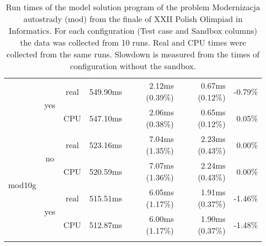 \documentclass[en]{pracamgr}
\begin{document}
\begin{appendices}
\begin{small}
\begin{longtable}{|l|c|c|r|r|r|r|}
                          \cline{2-7}
                          & \multirow{2}{*}{yes} & real & 549.90ms & 2.12ms (0.39\%) & 0.67ms (0.12\%) & -0.79\% \\*
                          &                      & CPU  & 547.10ms & 2.06ms (0.38\%) & 0.65ms (0.12\%) & 0.05\% \\
\hline
\multirow{4}{*}{mod10g}   & \multirow{2}{*}{no}  & real & 523.16ms & 7.04ms (1.35\%) & 2.23ms (0.43\%) & 0.00\% \\*
                          &                      & CPU  & 520.59ms & 7.07ms (1.36\%) & 2.24ms (0.43\%) & 0.00\% \\*
                          \cline{2-7}
                          & \multirow{2}{*}{yes} & real & 515.51ms & 6.05ms (1.17\%) & 1.91ms (0.37\%) & -1.46\% \\*
                          &                      & CPU  & 512.87ms & 6.00ms (1.17\%) & 1.90ms (0.37\%) & -1.48\% \\
\hline
\caption{Run times of the model solution program of the problem Modernizacja autostrady (mod) from the finale of XXII Polish Olimpiad in Informatics. For each configuration (Test case and Sandbox columns) the data was collected from 10 runs. Real and CPU times were collected from the same runs. Slowdown is measured from the times of configuration without the sandbox.}
\label{table:mod_model_solution_runtimes}
\end{longtable}
\end{small}


\end{appendices}
\end{document}
